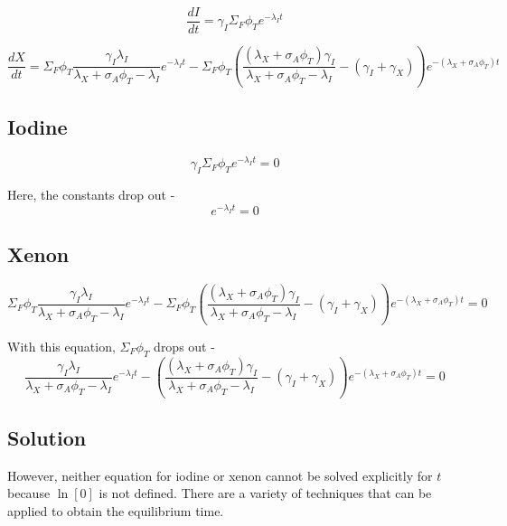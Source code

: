 \documentclass[11pt,a4paper]{article}
\begin{document}
\begin{equation}
        \frac{dI}{dt}=
        \gamma_I\Sigma_F\phi_T e^{-\lambda_I t}
\end{equation}

\begin{equation} 
    \frac{dX}{dt}=
        \Sigma_F\phi_T\frac{\gamma_I\lambda_I}{\lambda_X+\sigma_A\phi_T-\lambda_I}e^{-\lambda_I t}
        -\Sigma_F\phi_T(\frac{(\lambda_X+\sigma_A\phi_T)\gamma_I}{\lambda_X+\sigma_A\phi_T-\lambda_I}
        -(\gamma_I+\gamma_X))e^{-(\lambda_X+\sigma_A\phi_T)t}
\end{equation}

\subsection{Iodine}
\begin{equation}
        \gamma_I\Sigma_F\phi_T e^{-\lambda_I t} = 0
\end{equation}

Here, the constants drop out - 
\begin{equation}
        e^{-\lambda_I t} = 0
\end{equation}

\subsection{Xenon}
\begin{equation} 
        \Sigma_F\phi_T\frac{\gamma_I\lambda_I}{\lambda_X+\sigma_A\phi_T-\lambda_I}e^{-\lambda_I t}
        -\Sigma_F\phi_T(\frac{(\lambda_X+\sigma_A\phi_T)\gamma_I}{\lambda_X+\sigma_A\phi_T-\lambda_I}
        -(\gamma_I+\gamma_X))e^{-(\lambda_X+\sigma_A\phi_T)t}
        = 0
\end{equation}

With this equation, $\Sigma_F\phi_T$ drops out - 
\begin{equation} 
        \frac{\gamma_I\lambda_I}{\lambda_X+\sigma_A\phi_T-\lambda_I}e^{-\lambda_I t}
        -(\frac{(\lambda_X+\sigma_A\phi_T)\gamma_I}{\lambda_X+\sigma_A\phi_T-\lambda_I}
        -(\gamma_I+\gamma_X))e^{-(\lambda_X+\sigma_A\phi_T)t}
        = 0
\end{equation}

\subsection{Solution}
However, neither equation for iodine or xenon cannot be solved explicitly for $t$ because $\ln[0]$ is not defined. There are a variety of techniques that can be applied to obtain the equilibrium time. 
\end{document}
